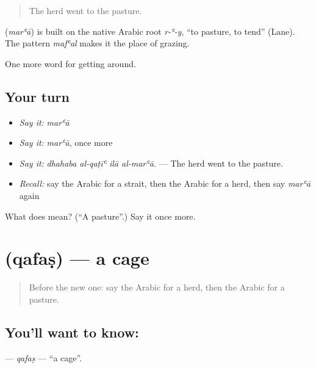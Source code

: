 \begin{quote}
The herd went to the pasture.
\end{quote}

\begin{cousinweb}
\textbf{} (\emph{marʿā}) is built on the native Arabic root \emph{r-ʿ-y}, \textquotedblleft{}to pasture, to tend\textquotedblright{} (Lane). The pattern \emph{mafʿal} makes it the place of grazing.
\end{cousinweb}

\begin{grammarlens}[title={What you've built}]
One more word for getting around.
\end{grammarlens}

\subsection*{Your turn}
\begin{itemize}
\raggedright
  \item \emph{Say it:} \emph{marʿā}
  \item \emph{Say it:} \emph{marʿā}, once more
  \item \emph{Say it:} \emph{dhahaba al-qaṭīʿ ilā al-marʿā.} — The herd went to the pasture.
  \item \emph{Recall:} say the Arabic for a strait, then the Arabic for a herd, then say \emph{marʿā} again
\end{itemize}

\begin{tcolorbox}[breakable,colback=teal!4,colframe=teal!35!black,title={Before you move on}]
What does  mean? (\textquotedblleft{}A pasture\textquotedblright{}.) Say it once more.
\end{tcolorbox}
\section[\texorpdfstring{\ar{قفص} (qafaṣ)}{قفص (qafaṣ)}]{ (qafaṣ) — a cage}

\label{lesson:AR-C478-qafas}



\begin{quote}
Before the new one: say the Arabic for a herd, then the Arabic for a pasture.
\end{quote}

\subsection*{You'll want to know: }
\textbf{} — \emph{qafaṣ} — \textquotedblleft{}a cage\textquotedblright{}.

